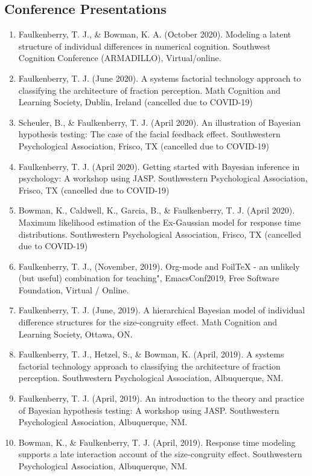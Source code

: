 \documentclass[article,10pt]{article}
\begin{document}
\subsection*{Conference Presentations}
\label{sec:org87f059a}
\begin{enumerate}
\item Faulkenberry, T. J., \& Bowman, K. A. (October 2020). Modeling a latent structure of individual differences in numerical cognition. Southwest Cognition Conference (ARMADILLO), Virtual/online.
\item Faulkenberry, T. J. (June 2020). A systems factorial technology approach to classifying the architecture of fraction perception. Math Cognition and Learning Society, Dublin, Ireland (cancelled due to COVID-19)
\item Scheuler, B., \& Faulkenberry, T. J. (April 2020). An illustration of Bayesian hypothesis testing: The case of the facial feedback effect. Southwestern Psychological Association, Frisco, TX (cancelled due to COVID-19)
\item Faulkenberry, T. J. (April 2020). Getting started with Bayesian inference in psychology: A workshop using JASP. Southwestern Psychological Association, Frisco, TX (cancelled due to COVID-19)
\item Bowman, K., Caldwell, K., Garcia, B., \& Faulkenberry, T. J. (April 2020). Maximum likelihood estimation of the Ex-Gaussian model for response time distributions. Southwestern Psychological Association, Frisco, TX (cancelled due to COVID-19)
\item Faulkenberry, T. J., (November, 2019). Org-mode and FoilTeX - an unlikely (but useful) combination for teaching", EmacsConf2019, Free Software Foundation, Virtual / Online.
\item Faulkenberry, T. J. (June, 2019). A hierarchical Bayesian model of individual difference structures for the size-congruity effect. Math Cognition and Learning Society, Ottawa, ON.
\item Faulkenberry, T. J., Hetzel, S., \& Bowman, K. (April, 2019). A systems factorial technology approach to classifying the architecture of fraction perception. Southwestern Psychological Association, Albuquerque, NM.
\item Faulkenberry, T. J. (April, 2019). An introduction to the theory and practice of Bayesian hypothesis testing: A workshop using JASP. Southwestern Psychological Association, Albuquerque, NM.
\item Bowman, K., \& Faulkenberry, T. J. (April, 2019). Response time modeling supports a late interaction account of the size-congruity effect. Southwestern Psychological Association, Albuquerque, NM.

\end{enumerate}
\end{document}
